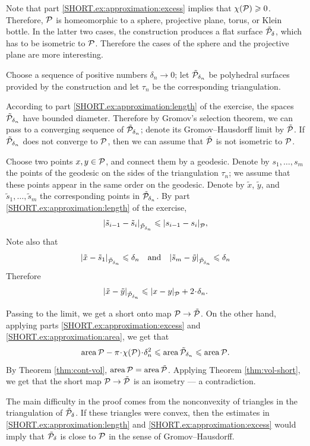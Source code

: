 Note that part \ref{SHORT.ex:approximation:excess} implies that $\chi(\mathcal{P})\geqslant 0$.
Therefore, $\mathcal{P}$ is homeomorphic to a sphere, projective plane, torus, or Klein bottle.
In the latter two cases, the construction produces a flat surface $\tilde{\mathcal{P}}_\delta$, which has to be isometric to $\mathcal{P}$.
Therefore the cases of the sphere and the projective plane are more interesting.

Choose a sequence of positive numbers $\delta_n\to0$;
let $\tilde{\mathcal{P}}_{\delta_n}$ be polyhedral surfaces provided by the construction and let $\tau_n$ be the corresponding triangulation.

According to part \ref{SHORT.ex:approximation:length} of the exercise, the spaces $\tilde{\mathcal{P}}_{\delta_n}$ have bounded diameter.
Therefore by Gromov's selection theorem, we can pass to a converging sequence of $\tilde{\mathcal{P}}_{\delta_n}$;
denote its Gromov--Hausdorff limit by $\tilde{\mathcal{P}}$.
If $\tilde{\mathcal{P}}_{\delta_n}$ does not converge to $\mathcal{P}$, then we can assume that $\tilde{\mathcal{P}}$ is not isometric to $\mathcal{P}$.

Choose two points $x,y\in \mathcal{P}$, and connect them by a geodesic.
Denote by $s_1,\dots,s_m$ the points of the geodesic on the sides of the triangulation $\tau_n$;
we assume that these points appear in the same order on the geodesic.
Denote by $\tilde x$, $\tilde y$, and $\tilde s_1,\dots,\tilde s_m$ the corresponding points in $\tilde{\mathcal{P}}_{\delta_n}$.
By part \ref{SHORT.ex:approximation:length} of the exercise,
\[\dist{\tilde s_{i-1}}{\tilde s_i}{\tilde{\spc{P}}_{\delta_n}}\le\dist{s_{i-1}}{s_i}{\spc{P}},\]
Note also that
\[\dist{\tilde x}{\tilde s_1}{\tilde{\spc{P}}_{\delta_n}}\le \delta_n
\quad\text{and}\quad
\dist{\tilde s_m}{\tilde y}{\tilde{\spc{P}}_{\delta_n}}\le \delta_n
\]
Therefore
\[\dist{\tilde x}{\tilde y}{\tilde{\spc{P}}_{\delta_n}}\le\dist{x}{y}{\spc{P}}+2\cdot\delta_n.\]

Passing to the limit, we get a short onto map $\mathcal{P}\to \tilde{\mathcal{P}}$.
On the other hand, applying parts \ref{SHORT.ex:approximation:excess} and \ref{SHORT.ex:approximation:area}, we get that
\[
\area \spc{P} -\pi\cdot\chi(\spc{P})\cdot \delta_n^2
\le
\area \tilde{\spc{P}}_{\delta_n}
\le
\area \spc{P}.
\]
By Theorem \ref{thm:cont-vol}, $\operatorname{\rm area}\nolimits \mathcal{P}= \operatorname{\rm area}\nolimits \tilde{\mathcal{P}}$.
Applying Theorem \ref{thm:vol-short}, we get that the short map $\mathcal{P}\to \tilde{\mathcal{P}}$ is an isometry --- a contradiction.
\qeds

The main difficulty in the proof comes from the nonconvexity of triangles in the triangulation of $\tilde{\mathcal{P}}_\delta$.
If these triangles were convex, then the estimates in \ref{SHORT.ex:approximation:length} and \ref{SHORT.ex:approximation:excess} would imply that $\tilde{\mathcal{P}}_\delta$ is close to $\mathcal{P}$ in the sense of Gromov--Hausdorff.













